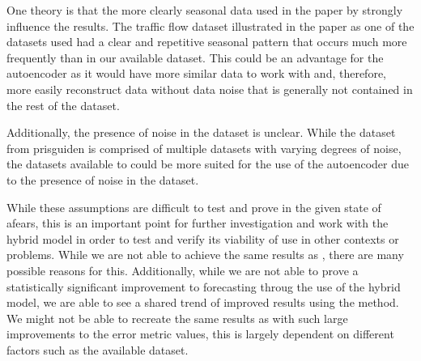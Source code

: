 One theory is that the more clearly seasonal data used in the paper by \cite{Zhao2019} strongly influence the results.
The traffic flow dataset illustrated in the paper as one of the datasets used had a clear and repetitive seasonal
pattern that occurs much more frequently than in our available dataset.
This could be an advantage for the autoencoder as it would have more similar data to work with and, therefore,
more easily reconstruct data without data noise that is generally not contained in the rest of the dataset.

Additionally, the presence of noise in the dataset is unclear.
While the dataset from prisguiden is comprised of multiple datasets with varying degrees of noise,
the datasets available to \cite{Zhao2019} could be more suited for the use of the autoencoder
due to the presence of noise in the dataset.

While these assumptions are difficult to test and prove in the given state of afears,
this is an important point for further investigation and work with the hybrid model in order
to test and verify its viability of use in other contexts or problems.
While we are not able to achieve the same results as \cite{Zhao2019}, there are many possible reasons for this.
Additionally, while we are not able to prove a statistically significant improvement to forecasting throug the use of
the hybrid model, we are able to see a shared trend of improved results using the method.
We might not be able to recreate the same results as \cite{Zhao2019} with such large
improvements to the error metric values, this is largely dependent on different factors such as the available dataset.

